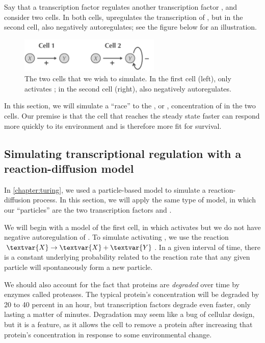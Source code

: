 Say that a transcription factor  regulates another transcription factor , and consider two cells. In both cells,  upregulates the transcription of , but in the second cell,  also negatively autoregulates; see the figure below for an illustration.

\begin{figure}[h]
\centering
\mySfFamily
\includegraphics[width = 0.6\textwidth]{../images/two_cells.png}
\caption{The two cells that we wish to simulate. In the first cell (left),  only activates ; in the second cell (right),  also negatively autoregulates.}
\label{fig:two_cells}
\end{figure}

In this section, we will simulate a ``race'' to the , or , concentration of  in the two cells. Our premise is that the cell that reaches the steady state faster can respond more quickly to its environment and is therefore more fit for survival.

\FloatBarrier
{}
\subsection{Simulating transcriptional regulation with a reaction-diffusion model}

In \autoref{chapter:turing}, we used a particle-based model to simulate a reaction-diffusion process. In this section, we will apply the same type of model, in which our ``particles'' are the two transcription factors  and .

We will begin with a model of the first cell, in which  activates  but we do not have negative autoregulation of . To simulate  activating , we use the reaction $\textvar{X} \rightarrow \textvar{X} + \textvar{Y}$. In a given interval of time, there is a constant underlying probability related to the reaction rate that any given  particle will spontaneously form a new  particle.

We should also account for the fact that proteins are \textit{degraded} over time by enzymes called proteases. The typical protein's concentration will be degraded by 20 to 40 percent in an hour, but transcription factors degrade even faster, only lasting a matter of minutes. Degradation may seem like a bug of cellular design, but it is a feature, as it allows the cell to remove a protein after increasing that protein's concentration in response to some environmental change.

